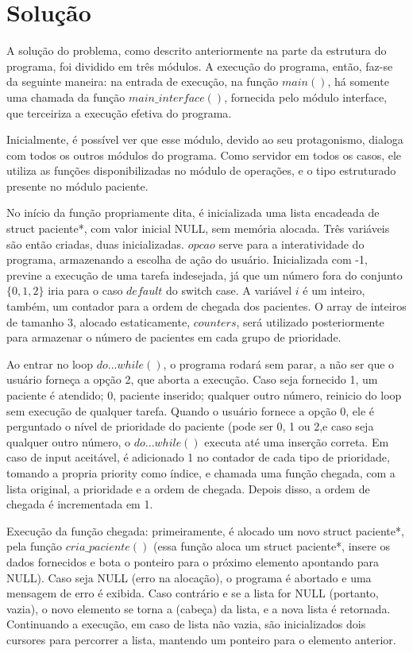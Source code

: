 \documentclass{article}
\begin{document}
\section{Solução}
A solução do problema, como descrito anteriormente na parte da estrutura do programa, foi dividido em três módulos. A execução do programa, então, faz-se da seguinte maneira: na entrada de execução, na função $main()$, há somente uma chamada da função $main\_interface()$, fornecida pelo módulo interface, que terceiriza a execução efetiva do programa. 

Inicialmente, é possível ver que esse módulo, devido ao seu protagonismo, dialoga com todos os outros módulos do programa. Como servidor em todos os casos, ele utiliza as funções disponibilizadas no módulo de operações, e o tipo estruturado presente no módulo paciente. 

No início da função propriamente dita, é inicializada uma lista encadeada de struct paciente*, com valor inicial NULL, sem memória alocada. Três variáveis são então criadas, duas inicializadas. $opcao$ serve para a interatividade do programa, armazenando a escolha de ação do usuário. Inicializada com -1, previne a execução de uma tarefa indesejada, já que um número fora do conjunto $\{0, 1, 2\}$ iria para o caso $default$ do switch case. A variável $i$ é um inteiro, também, um contador para a ordem de chegada dos pacientes. O array de inteiros de tamanho 3, alocado estaticamente, $counters$, será utilizado posteriormente para armazenar o número de pacientes em cada grupo de prioridade.
 
Ao entrar no loop $do...while()$, o programa rodará sem parar, a não ser que o usuário forneça a opção 2, que aborta a execução. Caso seja fornecido 1, um paciente é atendido; 0, paciente inserido; qualquer outro número, reinicio do loop sem execução de qualquer tarefa. Quando o usuário fornece a opção 0, ele é perguntado o nível de prioridade do paciente (pode ser 0, 1 ou 2,e caso seja qualquer outro número, o  $do...while()$ executa até uma inserção correta. Em caso de input aceitável, é adicionado 1 no contador de cada tipo de prioridade, tomando a propria priority como índice, e chamada uma função chegada, com a lista original, a prioridade e a ordem de chegada. Depois disso, a ordem de chegada é incrementada em 1.

Execução da função chegada: primeiramente, é alocado um novo struct paciente*, pela função $cria\_paciente()$ (essa função aloca um struct paciente*, insere os dados fornecidos e bota o ponteiro para o próximo elemento apontando para NULL). Caso seja NULL (erro na alocação), o programa é abortado e uma mensagem de erro é exibida. Caso contrário e se a lista for NULL (portanto, vazia), o novo elemento se torna a (cabeça) da lista, e a nova lista é retornada. Continuando a execução, em caso de lista não vazia, são inicializados dois cursores para percorrer a lista, mantendo um ponteiro para o elemento anterior.
\end{document}
